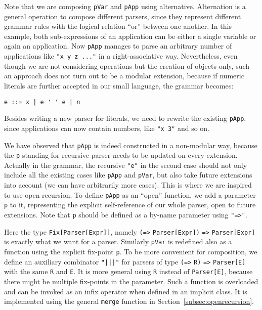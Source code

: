 Note that we are composing \lstinline{pVar} and \lstinline{pApp} using alternative. Alternation is a general operation to compose different parsers, since they represent different grammar rules with the logical relation ``or'' between one another. In this example, both sub-expressions of an application can be either a single variable or again an application. Now \lstinline{pApp} manages to parse an arbitrary number of applications like \lstinline{"x y z ..."} in a right-associative way.
Nevertheless, even though we are not considering operations but the creation of objects only, such an approach does not turn out to be a modular extension, because if numeric literals are further accepted in our small language, the grammar becomes:
\begin{lstlisting}
e ::= x | e ' ' e | n
\end{lstlisting}
Besides writing a new parser for literals, we need to rewrite the existing \lstinline{pApp}, since applications can now contain numbers, like \lstinline{"x 3"} and so on.


We have observed that \lstinline{pApp} is indeed constructed in a non-modular way, because the \lstinline{p} standing for recursive parser needs to be updated on every extension. Actually in the grammar, the recursive \lstinline{"e"} in the second case should not only include all the existing cases like \lstinline{pApp} and \lstinline{pVar}, but also take future extensions into account (we can have arbitrarily more cases). This is where we are inspired to use open recursion. To define \lstinline{pApp} as an ``open'' function, we add a parameter \lstinline{p} to it, representing the explicit self-reference of our whole parser, open to future extensions. Note that \lstinline{p} should be defined as a by-name parameter using \lstinline{"=>"}.


Here the type \lstinline{Fix[Parser[Expr]]}, namely \lstinline{(=>} \lstinline{Parser[Expr])} \lstinline{=>} \lstinline{Parser[Expr]} is exactly what we want for a parser. Similarly \lstinline{pVar} is redefined also as a function using the explicit fix-point \lstinline{p}. To be more convenient for composition, we define an auxiliary combinator \lstinline{"|||"} for parsers of type \lstinline{(=>} \lstinline{R)} \lstinline{=>} \lstinline{Parser[E]} with the same \lstinline{R} and \lstinline{E}. It is more general using \lstinline{R} instead of \lstinline{Parser[E]}, because there might be multiple fix-points in the parameter. Such a function is overloaded and can be invoked as an infix operator when defined in an implicit class. It is implemented using the general \lstinline{merge} function in Section~\ref{subsec:openrecursion}.

